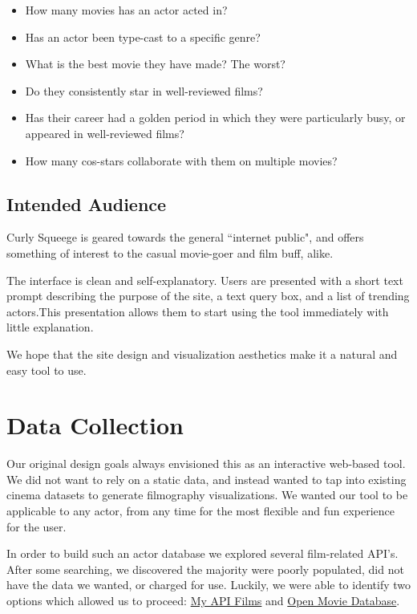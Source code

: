 \documentclass[12pt]{article}
\begin{document}
	\begin{itemize}
		\item How many movies has an actor acted in?
		\item Has an actor been type-cast to a specific genre?
		\item What is the best movie they have made? The worst?
		\item Do they consistently star in well-reviewed films?
		\item Has their career had a golden period in which they were particularly busy, or appeared in well-reviewed films?
		\item How many cos-stars collaborate with them on multiple movies?
	\end{itemize}
	
\subsection{Intended Audience}
Curly Squeege is geared towards the general ``internet public", and offers something of interest to the casual movie-goer  and film buff, alike.  

The interface is clean and self-explanatory.  
Users are presented with a short text prompt describing the purpose of the site, a text query box, and a list of trending actors.This presentation allows them to start using the tool immediately with little explanation.

We hope that the site design and visualization aesthetics make it a natural and easy tool to use.
\newpage 

\section{Data Collection}

Our original design goals always envisioned this as an interactive web-based tool.  We did not want to rely on a static data, and instead wanted to tap into existing cinema datasets to generate filmography visualizations.  We wanted our tool to be applicable to any actor, from any time for the most flexible and fun experience for the user. 

	In order to build such an actor database we explored several film-related API's.  After some searching, we discovered the majority were poorly populated, did not have the data we wanted, or charged for use.  Luckily, we were able to identify two options which allowed us to proceed: \href{http://api.myapifilms.com/index.do}{My API Films} and \href{http://www.omdbapi.com/}{Open Movie Database}. 
	
\end{document}

